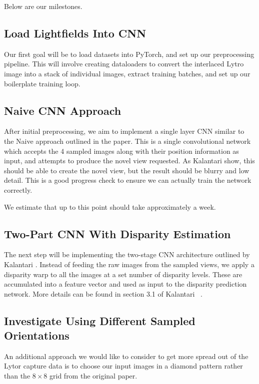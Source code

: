 \documentclass[10pt,twocolumn,letterpaper]{article}
\begin{document}
Below are our milestones.

\subsection{Load Lightfields Into CNN}

Our first goal will be to load datasets into PyTorch, and set up our preprocessing pipeline.
This will involve creating dataloaders to convert the interlaced Lytro image into a stack of individual images,
extract training batches, and set up our boilerplate training loop.

\subsection{Naive CNN Approach}

After initial preprocessing, we aim to implement a single layer CNN similar to the
Naive approach outlined in the paper. This is a single convolutional network which
accepts the 4 sampled images along with their position information as input, and
attempts to produce the novel view requested. As Kalantari \etal show, this should be able
to create the novel view, but the result should be blurry and low detail. This is a good
progress check to ensure we can actually train the network correctly.

We estimate that up to this point should take approximately a week.

\subsection{Two-Part CNN With Disparity Estimation}

The next step will be implementing the two-stage CNN architecture outlined by Kalantari \etal.
Instead of feeding the raw images from the sampled views, we apply a disparity warp to all the
images at a set number of disparity levels. These are accumulated into a feature vector and used as
input to the disparity prediction network. More details can be found in section 3.1 of 
Kalantari \etal~\cite{LearningViewSynthesis}.


\subsection{Investigate Using Different Sampled Orientations}

An additional approach we would like to consider to get more spread out of the Lytor capture data
is to choose our input images in a diamond pattern rather than the $8 \times 8$ grid from the original
paper.
\end{document}
